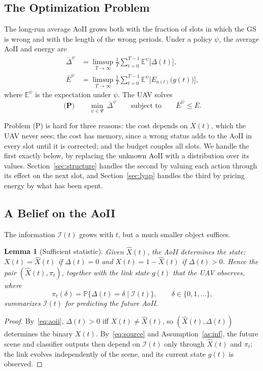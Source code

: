 \documentclass[10pt,journal,compsoc]{IEEEtran}
\newtheorem{lemma}{Lemma}
\theoremstyle{remark}
\newcommand{\E}{\mathbb{E}}
\newcommand{\Prob}{\mathbb{P}}
\newcommand{\I}{\mathcal{I}}
\begin{document}
\subsection{The Optimization Problem}
The long-run average AoII grows both with the fraction of slots in which the GS is wrong and with the length of the wrong periods. Under a policy $\psi$, the average AoII and energy are
\begin{align}
\bar\Delta^{\psi}&=\limsup_{T\to\infty}\frac1T\sum_{t=0}^{T-1}\E^{\psi}\big[\Delta(t)\big],\label{eq:avgaoii}\\
\bar E^{\psi}&=\limsup_{T\to\infty}\frac1T\sum_{t=0}^{T-1}\E^{\psi}\Big[E_{a(t)}\big(g(t)\big)\Big],\label{eq:avgE}
\end{align}
where $\E^{\psi}$ is the expectation under $\psi$. The UAV solves
\begin{equation}\label{eq:P}
\textbf{(P)}\qquad \min_{\psi\in\Psi}\ \bar\Delta^{\psi}\qquad\text{subject to}\qquad \bar E^{\psi}\le\bar E.
\end{equation}

Problem (P) is hard for three reasons: the cost depends on $X(t)$, which the UAV never sees; the cost has memory, since a wrong status adds to the AoII in every slot until it is corrected; and the budget couples all slots. We handle the first exactly below, by replacing the unknown AoII with a distribution over its values. Section~\ref{sec:structure} handles the second by valuing each action through its effect on the next slot, and Section~\ref{sec:lyap} handles the third by pricing energy by what has been spent.

\subsection{A Belief on the AoII}\label{sec:belief}
The information $\I(t)$ grows with $t$, but a much smaller object suffices.

\begin{lemma}[Sufficient statistic]\label{lem:suff}
Given $\hat X(t)$, the AoII determines the state: $X(t)=\hat X(t)$ if $\Delta(t)=0$ and $X(t)=1-\hat X(t)$ if $\Delta(t)>0$. Hence the pair $(\hat X(t),\pi_t)$, together with the link state $g(t)$ that the UAV observes, where
\begin{equation}\label{eq:belief}
\pi_t(\delta)=\Prob\big\{\Delta(t)=\delta\mid\I(t)\big\},\qquad\delta\in\{0,1,\dots\},
\end{equation}
summarizes $\I(t)$ for predicting the future AoII.
\end{lemma}
\begin{proof}
By~\eqref{eq:aoii}, $\Delta(t)>0$ iff $X(t)\neq\hat X(t)$, so $(\hat X(t),\Delta(t))$ determines the binary $X(t)$. By~\eqref{eq:source} and Assumption~\ref{as:inf}, the future scene and classifier outputs then depend on $\I(t)$ only through $\hat X(t)$ and $\pi_t$; the link evolves independently of the scene, and its current state $g(t)$ is observed.
\end{proof}
\end{document}
